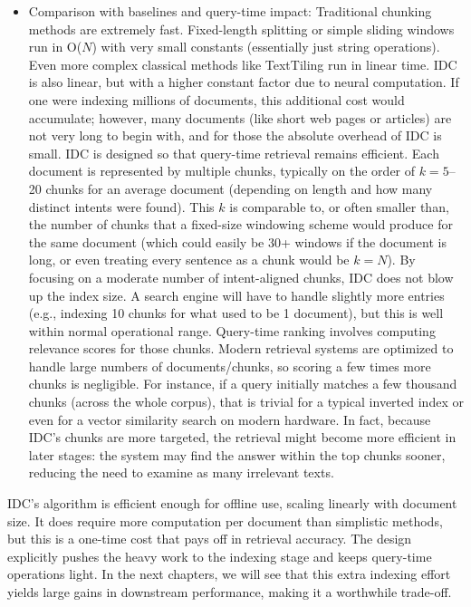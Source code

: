 \documentclass[12pt,a4paper]{report}
\begin{document}
\begin{itemize}
\item Comparison with baselines and query-time impact: Traditional chunking methods are extremely fast. Fixed-length splitting or simple sliding windows run in O($N$) with very small constants (essentially just string operations). Even more complex classical methods like TextTiling run in linear time. IDC is also linear, but with a higher constant factor due to neural computation. If one were indexing millions of documents, this additional cost would accumulate; however, many documents (like short web pages or articles) are not very long to begin with, and for those the absolute overhead of IDC is small. IDC is designed so that query-time retrieval remains efficient. Each document is represented by multiple chunks, typically on the order of $k = 5$--20 chunks for an average document (depending on length and how many distinct intents were found). This $k$ is comparable to, or often smaller than, the number of chunks that a fixed-size windowing scheme would produce for the same document (which could easily be 30+ windows if the document is long, or even treating every sentence as a chunk would be $k=N$). By focusing on a moderate number of intent-aligned chunks, IDC does not blow up the index size. A search engine will have to handle slightly more entries (e.g., indexing 10 chunks for what used to be 1 document), but this is well within normal operational range. Query-time ranking involves computing relevance scores for those chunks. Modern retrieval systems are optimized to handle large numbers of documents/chunks, so scoring a few times more chunks is negligible. For instance, if a query initially matches a few thousand chunks (across the whole corpus), that is trivial for a typical inverted index or even for a vector similarity search on modern hardware. In fact, because IDC's chunks are more targeted, the retrieval might become more efficient in later stages: the system may find the answer within the top chunks sooner, reducing the need to examine as many irrelevant texts.
\end{itemize}

IDC's algorithm is efficient enough for offline use, scaling linearly with document size. It does require more computation per document than simplistic methods, but this is a one-time cost that pays off in retrieval accuracy. The design explicitly pushes the heavy work to the indexing stage and keeps query-time operations light. In the next chapters, we will see that this extra indexing effort yields large gains in downstream performance, making it a worthwhile trade-off.
\end{document}
